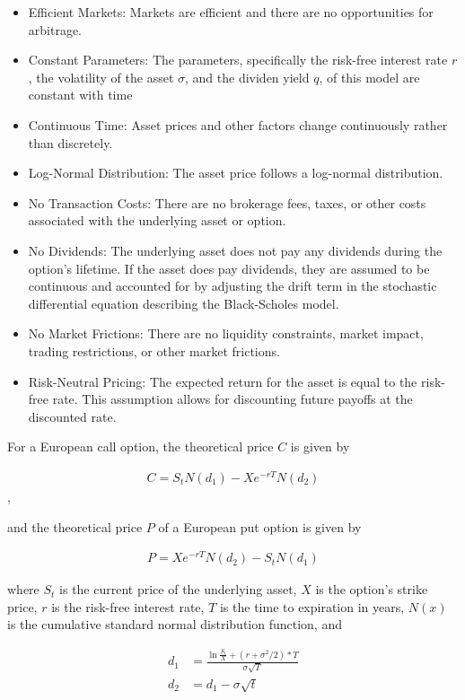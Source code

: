\documentclass[a4paper,11pt]{article}
\begin{document}
\begin{itemize}
  \item Efficient Markets: Markets are efficient and there are no opportunities for arbitrage.
  \item Constant Parameters: The parameters, specifically the risk-free interest rate $r$, 
  the volatility of the asset $\sigma$, and the dividen yield $q$, of this model are constant with time
  \item Continuous Time: Asset prices and other factors change continuously rather than discretely.
  \item Log-Normal Distribution: The asset price follows a log-normal distribution. 
  \item No Transaction Costs: There are no brokerage fees, taxes, or other costs associated with the 
  underlying asset or option.
  \item No Dividends: The underlying asset does not pay any dividends during the option's lifetime.
        If the asset does pay dividends, they are assumed to be continuous and accounted for by adjusting the drift
        term in the stochastic differential equation describing the Black-Scholes model.
  \item No Market Frictions: There are no liquidity constraints, market impact, trading restrictions, or
  other market frictions.
  \item Risk-Neutral Pricing: The expected return for the asset is equal to the risk-free rate. This assumption
        allows for discounting future payoffs at the discounted rate.
\end{itemize}

For a European call option, the theoretical price $C$ is given by

\begin{align}
  C = S_t N(d_1) - X e^{-rT} N(d_2)
\end{align},

and the theoretical price $P$ of a European put option is given by

\begin{align}
  P = X e^{-r T} N(d_2) - S_t N(d_1)
\end{align}

where $S_t$ is the current price of the underlying asset, $X$ is the option's strike price,
$r$ is the risk-free interest rate, $T$ is the time to expiration in years,
$N(x)$ is the cumulative standard normal distribution function, and

\begin{align}
  d_1 &= \frac{\ln{\frac{S_t}{X}} + (r + \sigma^2/2)*T}{\sigma \sqrt{T}} \\
  d_2 &= d_1 - \sigma \sqrt{t}
\end{align}
\end{document}
